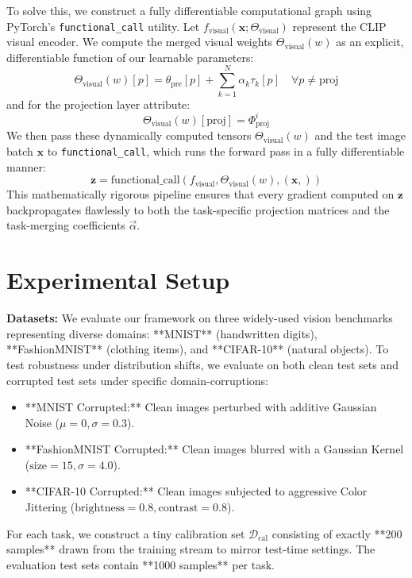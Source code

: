 \documentclass{article}
\theoremstyle{plain}
\theoremstyle{definition}
\theoremstyle{remark}
\begin{document}
To solve this, we construct a fully differentiable computational graph using PyTorch's \texttt{functional\_call} utility. Let $f_{\text{visual}}(\mathbf{x}; \Theta_{\text{visual}})$ represent the CLIP visual encoder. We compute the merged visual weights $\Theta_{\text{visual}}(w)$ as an explicit, differentiable function of our learnable parameters:
\begin{equation}
    \Theta_{\text{visual}}(w)[p] = \theta_{\text{pre}}[p] + \sum_{k=1}^N \alpha_k \tau_k[p] \quad \forall p \neq \text{proj}
\end{equation}
and for the projection layer attribute:
\begin{equation}
    \Theta_{\text{visual}}(w)[\text{proj}] = \Phi_{\text{proj}}^i
\end{equation}
We then pass these dynamically computed tensors $\Theta_{\text{visual}}(w)$ and the test image batch $\mathbf{x}$ to \texttt{functional\_call}, which runs the forward pass in a fully differentiable manner:
\begin{equation}
    \mathbf{z} = \text{functional\_call}(f_{\text{visual}}, \Theta_{\text{visual}}(w), (\mathbf{x},))
\end{equation}
This mathematically rigorous pipeline ensures that every gradient computed on $\mathbf{z}$ backpropagates flawlessly to both the task-specific projection matrices and the task-merging coefficients $\vec{\alpha}$.

\section{Experimental Setup}
\label{experiments}

\textbf{Datasets:} We evaluate our framework on three widely-used vision benchmarks representing diverse domains: **MNIST** (handwritten digits), **FashionMNIST** (clothing items), and **CIFAR-10** (natural objects). To test robustness under distribution shifts, we evaluate on both clean test sets and corrupted test sets under specific domain-corruptions:
\begin{itemize}
    \item **MNIST Corrupted:** Clean images perturbed with additive Gaussian Noise ($\mu=0, \sigma=0.3$).
    \item **FashionMNIST Corrupted:** Clean images blurred with a Gaussian Kernel ($\text{size}=15, \sigma=4.0$).
    \item **CIFAR-10 Corrupted:** Clean images subjected to aggressive Color Jittering ($\text{brightness}=0.8, \text{contrast}=0.8$).
\end{itemize}
For each task, we construct a tiny calibration set $\mathcal{D}_{\text{cal}}$ consisting of exactly **200 samples** drawn from the training stream to mirror test-time settings. The evaluation test sets contain **1000 samples** per task.
\end{document}
